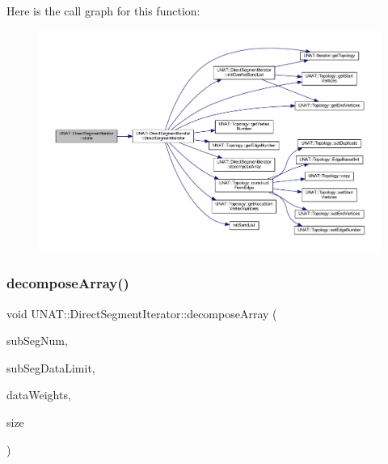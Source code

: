 Here is the call graph for this function\+:
\nopagebreak
\begin{figure}[H]
\begin{center}
\leavevmode
\includegraphics[width=350pt]{classUNAT_1_1DirectSegmentIterator_a998b5eef5895e387e54811ef3f5ffd84_cgraph}
\end{center}
\end{figure}
\mbox{\label{classUNAT_1_1DirectSegmentIterator_abe078eae31fdecd5a4b4adf4fb96a663}} 
\subsubsection{\texorpdfstring{decomposeArray()}{decomposeArray()}\hspace{0.1cm}{\footnotesize\ttfamily [1/2]}}
{\footnotesize\ttfamily void U\+N\+A\+T\+::\+Direct\+Segment\+Iterator\+::decompose\+Array (\begin{DoxyParamCaption}\item[{\mbox{\hyperlink{include_2swMacro_8h_a113cf5f6b5377cdf3fac6aa4e443e9aa}{sw\+Int}}}]{sub\+Seg\+Num,  }\item[{\mbox{\hyperlink{include_2swMacro_8h_a113cf5f6b5377cdf3fac6aa4e443e9aa}{sw\+Int}}}]{sub\+Seg\+Data\+Limit,  }\item[{\mbox{\hyperlink{include_2swMacro_8h_a113cf5f6b5377cdf3fac6aa4e443e9aa}{sw\+Int}} $\ast$}]{data\+Weights,  }\item[{\mbox{\hyperlink{include_2swMacro_8h_a113cf5f6b5377cdf3fac6aa4e443e9aa}{sw\+Int}}}]{size }\end{DoxyParamCaption})\hspace{0.3cm}{\ttfamily [private]}}

